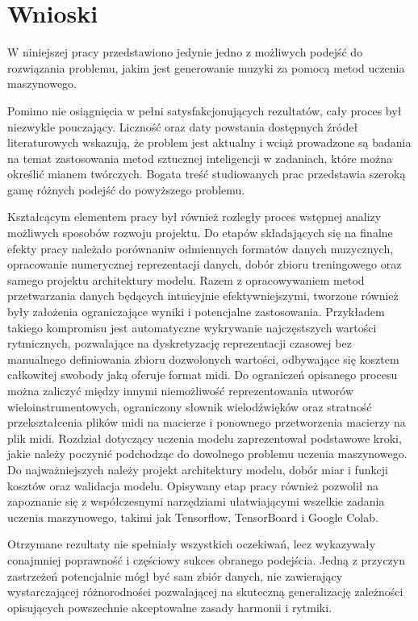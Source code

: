 \chapter{Wnioski}
{
    W niniejszej pracy przedstawiono jedynie jedno z możliwych podejść do rozwiązania problemu,
    jakim jest generowanie muzyki za pomocą metod uczenia maszynowego. 

    Pomimo nie osiągnięcia w pełni satysfakcjonujących rezultatów, cały proces był niezwykle pouczający. 
    Liczność oraz daty powstania dostępnych źródeł literaturowych wskazują, że problem jest aktualny 
    i wciąż prowadzone są badania na temat zastosowania metod sztucznej inteligencji w zadaniach, 
    które można określić mianem twórczych. Bogata treść studiowanych prac przedstawia szeroką gamę 
    różnych podejść do powyższego problemu.

    Kształcącym elementem pracy był również rozległy proces wstępnej analizy możliwych sposobów
    rozwoju projektu. Do etapów składających się na finalne efekty pracy należało porównaniw odmiennych 
    formatów danych muzycznych, opracowanie numerycznej reprezentacji danych, dobór zbioru treningowego
    oraz samego projektu architektury modelu. 
    Razem z opracowywaniem metod przetwarzania danych będących intuicyjnie efektywniejszymi, tworzone również były założenia
    ograniczające wyniki i potencjalne zastosowania. Przykładem takiego kompromisu jest automatyczne wykrywanie
    najczęstszych wartości rytmicznych, pozwalające na dyskretyzację reprezentacji czasowej bez
    manualnego definiowania zbioru dozwolonych wartości, odbywające się kosztem całkowitej swobody jaką oferuje format midi.
    Do ograniczeń opisanego procesu można zaliczyć między innymi niemożliwość reprezentowania utworów wieloinstrumentowych, 
    ograniczony słownik wielodźwięków oraz stratność przekształcenia plików midi na macierze i ponownego przetworzenia
    macierzy na plik midi.
    Rozdział dotyczący uczenia modelu zaprezentował podstawowe kroki, jakie należy poczynić podchodząc do
    dowolnego problemu uczenia maszynowego. Do najważniejszych należy projekt architektury modelu,
    dobór miar i funkcji kosztów oraz walidacja modelu. Opisywany etap pracy również pozwolił na zapoznanie 
    się z współczesnymi narzędziami ułatwiającymi wszelkie zadania uczenia maszynowego, takimi jak Tensorflow, 
    TensorBoard i Google Colab. 

    Otrzymane rezultaty nie spełniały wszystkich oczekiwań, lecz wykazywały conajmniej poprawność i częściowy
    sukces obranego podejścia. Jedną z przyczyn zastrzeżeń potencjalnie mógł być sam zbiór danych, nie 
    zawierający wystarczającej różnorodności pozwalającej na skuteczną generalizację zależności opisujących 
    powszechnie akceptowalne zasady harmonii i rytmiki.

}

